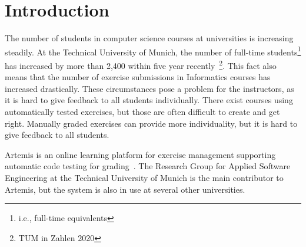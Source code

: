 
\def\proposal{Proposal for}

\usepackage[nolist]{acronym}
\usepackage{csquotes}


\setlength{\evensidemargin}{22pt}
\setlength{\oddsidemargin}{22pt}



\lstset{showspaces=false, numbers=left, frame=single, basicstyle=\small}




\fancyhead{}
\pagestyle{fancy}
\fancyhead[LE]{\slshape \leftmark}
\fancyhead[RO]{\slshape \rightmark}
\headheight=15pt

\section*{Introduction}

The number of students in computer science courses at universities is increasing steadily. At the Technical University of Munich, the number of full-time students\footnote{i.e., full-time equivalents} has increased by more than 2,400 within five year recently~\footnote{TUM in Zahlen 2020}. This fact also means that the number of exercise submissions in Informatics courses has increased drastically.
These circumstances pose a problem for the instructors, as it is hard to give feedback to all students individually. There exist courses using automatically tested exercises, but those are often difficult to create and get right. Manually graded exercises can provide more individuality, but it is hard to give feedback to all students.

Artemis is an online learning platform for exercise management supporting automatic code testing for grading~\cite{ArTEMiS}. The Research Group for Applied Software Engineering at the Technical University of Munich is the main contributor to Artemis, but the system is also in use at several other universities.

